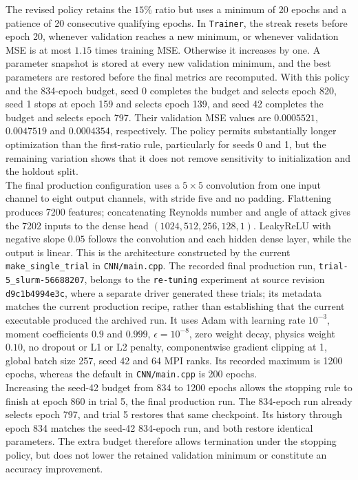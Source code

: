 The revised policy retains the $15\%$ ratio but uses a minimum of 20 epochs and a patience of 20 consecutive qualifying epochs. In \texttt{Trainer}, the streak resets before epoch 20, whenever validation reaches a new minimum, or whenever validation MSE is at most $1.15$ times training MSE. Otherwise it increases by one. A parameter snapshot is stored at every new validation minimum, and the best parameters are restored before the final metrics are recomputed. With this policy and the 834-epoch budget, seed 0 completes the budget and selects epoch 820, seed 1 stops at epoch 159 and selects epoch 139, and seed 42 completes the budget and selects epoch 797. Their validation MSE values are $0.0005521$, $0.0047519$ and $0.0004354$, respectively. The policy permits substantially longer optimization than the first-ratio rule, particularly for seeds 0 and 1, but the remaining variation shows that it does not remove sensitivity to initialization and the holdout split.\\

The final production configuration uses a $5\times5$ convolution from one input channel to eight output channels, with stride five and no padding. Flattening produces 7200 features; concatenating Reynolds number and angle of attack gives the 7202 inputs to the dense head $(1024,512,256,128,1)$. LeakyReLU with negative slope $0.05$ follows the convolution and each hidden dense layer, while the output is linear. This is the architecture constructed by the current \texttt{make\_single\_trial} in \texttt{CNN/main.cpp}. The recorded final production run, \texttt{trial-5\_slurm-56688207}, belongs to the \texttt{re-tuning} experiment at source revision \texttt{d9c1b4994e3c}, where a separate driver generated these trials; its metadata matches the current production recipe, rather than establishing that the current executable produced the archived run. It uses Adam with learning rate $10^{-3}$, moment coefficients $0.9$ and $0.999$, $\epsilon=10^{-8}$, zero weight decay, physics weight $0.10$, no dropout or L1 or L2 penalty, componentwise gradient clipping at 1, global batch size 257, seed 42 and 64 MPI ranks. Its recorded maximum is 1200 epochs, whereas the default in \texttt{CNN/main.cpp} is 200 epochs.\\

Increasing the seed-42 budget from 834 to 1200 epochs allows the stopping rule to finish at epoch 860 in trial 5, the final production run. The 834-epoch run already selects epoch 797, and trial 5 restores that same checkpoint. Its history through epoch 834 matches the seed-42 834-epoch run, and both restore identical parameters. The extra budget therefore allows termination under the stopping policy, but does not lower the retained validation minimum or constitute an accuracy improvement.\\

